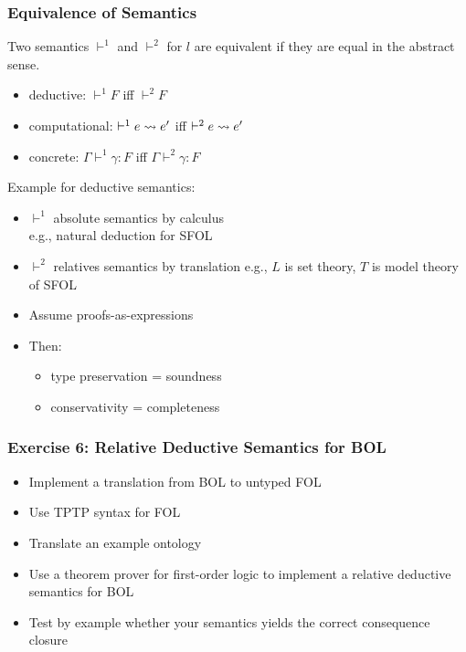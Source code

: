 \begin{frame}\frametitle{Equivalence of Semantics}
Two semantics $\vdash^1$ and $\vdash^2$ for $l$ are equivalent if they are equal in the abstract sense.
\begin{itemize}
\item deductive: $\vdash^1 F$ iff $\vdash^2 F$
\item computational: $\vdash^1 e\rightsquigarrow e'$ iff $\vdash^2 e\rightsquigarrow e'$
\item concrete: $\Gamma\vdash^1 \gamma:F$ iff $\Gamma\vdash^2 \gamma:F$
\end{itemize}

Example for deductive semantics:
\begin{itemize}
\item $\vdash^1$ absolute semantics by calculus \\
 e.g., natural deduction for SFOL
\item $\vdash^2$ relatives semantics by translation
 e.g., $L$ is set theory, $T$ is model theory of SFOL
\item Assume proofs-as-expressions
\item Then:
 \begin{itemize}
 \item type preservation = soundness
 \item conservativity = completeness
 \end{itemize}
\end{itemize}
\end{frame}

\begin{frame}\frametitle{Exercise 6: Relative Deductive Semantics for BOL}
\begin{itemize}
\item Implement a translation from BOL to untyped FOL
\item Use TPTP syntax for FOL
\item Translate an example ontology
\item Use a theorem prover for first-order logic to implement a relative deductive semantics for BOL
\item Test by example whether your semantics yields the correct consequence closure
\end{itemize}
\end{frame}


